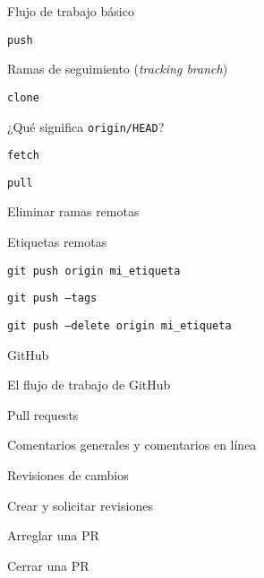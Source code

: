 \begin{longenum}
\begin{longenum}
\begin{longenum}
            \item Flujo de trabajo básico
            \begin{longenum}
                \item \texttt{push}
                \begin{longenum}
                    \item Ramas de seguimiento (\textit{tracking branch})
                \end{longenum}
                \item \texttt{clone}
                \begin{longenum}
                    \item ¿Qué significa \texttt{origin/HEAD}?
                \end{longenum}
                \item \texttt{fetch}
                \item \texttt{pull}
            \end{longenum}
            \item Eliminar ramas remotas 
            \item Etiquetas remotas
            \begin{longenum}
                \item \texttt{git push origin mi\_etiqueta}
                \item \texttt{git push --tags}
                \item \texttt{git push --delete origin mi\_etiqueta}
            \end{longenum}
        \end{longenum}
        \item GitHub
        \begin{longenum}
            \item El flujo de trabajo de GitHub
            \item Pull requests
            \begin{longenum}
                \item Comentarios generales y comentarios en línea
                \item Revisiones de cambios
                \begin{longenum}
                    \item Crear y solicitar revisiones
                \end{longenum}
                \item Arreglar una PR
                \item Cerrar una PR

\end{longenum}
\end{longenum}
\end{longenum}
\end{longenum}
